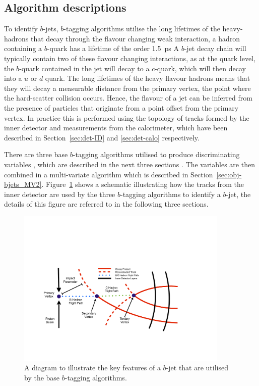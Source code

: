 \subsection{Algorithm descriptions}

To identify $b$-jets, $b$-tagging algorithms utilise the long lifetimes of the heavy-hadrons that decay through the flavour changing weak interaction,
a hadron containing a $b$-quark has a lifetime of the order \SI{1.5}{\pico\second} %
A $b$-jet decay chain  will typically contain two of these flavour changing interactions, 
as at the quark level, the $b$-quark contained in the jet will decay to a $c$-quark, which will then decay into a $u$ or $d$ quark.
The long lifetimes of the heavy flavour hadrons means that they will decay a measurable distance from the 
primary vertex, the point where the hard-scatter collision occurs.
Hence, the flavour of a jet can be inferred from the presence of particles
that originate from a point offset from the primary vertex.
In practice this is performed using the topology of tracks formed by the inner detector
and measurements from the calorimeter, which have been described in Section~\ref{sec:det-ID} and \ref{sec:det-calo} respectively.
   
There are three base $b$-tagging algorithms utilised to produce discriminating variables \cite{obj-bjets_algo_2016}, which are described in the next three sections .
The variables are then combined in a multi-variate algorithm which is described in Section~\ref{sec:obj-bjets_MV2}.
Figure~\ref{fig:obj_bjets_schem} shows a schematic illustrating how the tracks from the inner detector
are used by the three $b$-tagging algorithms to identify a $b$-jet, the details of this figure are referred to in the following three sections.

\begin{figure}[!htb]
  \begin{center}
    \includegraphics[width=0.9\textwidth]{figs/Objects/bjets_schem.pdf}
    \caption{A diagram to illustrate the key features of a $b$-jet that are utilised by the base $b$-tagging algorithms.}
    \label{fig:obj_bjets_schem}
  \end{center}
  \vspace{-0.5cm}
\end{figure}

